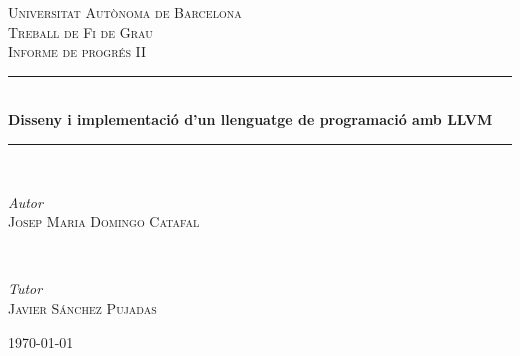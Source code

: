 ﻿\documentclass{article}
\begin{document}
\begin{titlepage}
	\newcommand{\HRule}{\rule{\linewidth}{0.4mm}} %
	
	\center

    \vspace*{25px}
	
	\textsc{\LARGE Universitat Autònoma de Barcelona}\\[1.5cm]

	\textsc{\Large Treball de Fi de Grau}\\[0.5cm]
	
	\textsc{\Large Informe de progrés II}\\[0.5cm]
	
	\HRule\\[0.4cm]
	
	{\LARGE\bfseries Disseny i implementació d'un llenguatge de programació amb LLVM}\\[0.4cm]
	
	\HRule\\[1.5cm]
	
	
	\begin{minipage}{0.5\textwidth}
		\begin{flushleft}
			\large
			\textit{Autor}\\
			\textsc{Josep Maria Domingo Catafal}
		\end{flushleft}
	\end{minipage}
	~
	\begin{minipage}{0.4\textwidth}
		\begin{flushright}
			\large
			\textit{Tutor}\\
			\textsc{Javier Sánchez Pujadas}
		\end{flushright}
	\end{minipage}
	

	\vfill\vfill\vfill %
	
	{\large\today} %

	\vfill %
\end{titlepage}

\tableofcontents
\newpage

\end{document}
